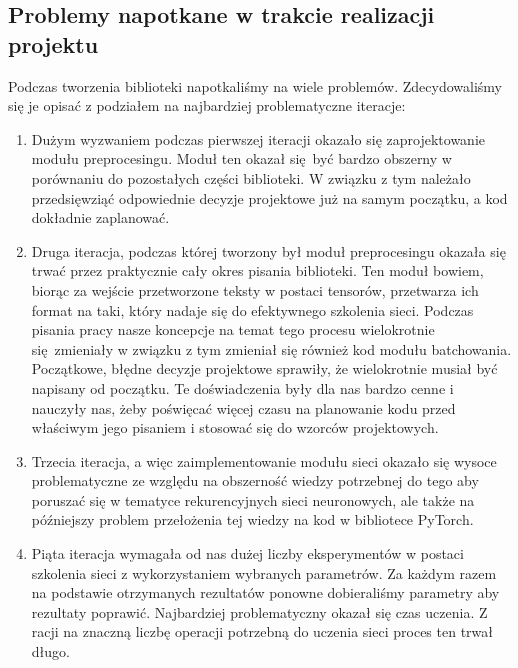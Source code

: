\subsection{Problemy napotkane w trakcie realizacji projektu}
Podczas tworzenia biblioteki napotkaliśmy na wiele problemów. Zdecydowaliśmy się je opisać z podziałem na
najbardziej problematyczne iteracje:

\begin{enumerate}
  \item Dużym wyzwaniem podczas pierwszej iteracji okazało
  się zaprojektowanie modułu preprocesingu. Moduł ten okazał się być bardzo obszerny w porównaniu do
  pozostałych części biblioteki. W związku z tym należało przedsięwziąć odpowiednie decyzje projektowe
  już na samym początku, a kod dokładnie zaplanować.

  \item Druga iteracja, podczas której tworzony był moduł preprocesingu okazała się trwać przez praktycznie
  cały okres pisania biblioteki. Ten moduł bowiem, biorąc za wejście przetworzone teksty w postaci tensorów,
  przetwarza ich format na taki, który nadaje się do efektywnego szkolenia sieci. Podczas pisania pracy
  nasze koncepcje na temat tego procesu wielokrotnie się zmieniały w związku z tym zmieniał się również
  kod modułu batchowania. Początkowe, błędne decyzje projektowe sprawiły, że wielokrotnie musiał być
  napisany od początku. Te doświadczenia były dla nas bardzo cenne i nauczyły nas, żeby poświęcać
  więcej czasu na planowanie kodu przed właściwym jego pisaniem i stosować się do wzorców projektowych.

  \item Trzecia iteracja, a więc zaimplementowanie modułu sieci okazało się wysoce problematyczne ze względu na obszerność
  wiedzy potrzebnej do tego aby poruszać się w tematyce rekurencyjnych sieci neuronowych, ale także
  na późniejszy problem przełożenia tej wiedzy na kod w bibliotece PyTorch.

  \item Piąta iteracja wymagała od nas dużej liczby eksperymentów w postaci szkolenia sieci z wykorzystaniem wybranych
  parametrów. Za każdym razem na podstawie otrzymanych rezultatów ponowne dobieraliśmy parametry aby rezultaty poprawić.
  Najbardziej problematyczny okazał się czas uczenia. Z racji na znaczną liczbę operacji potrzebną do
  uczenia sieci proces ten trwał długo.
\end{enumerate}
